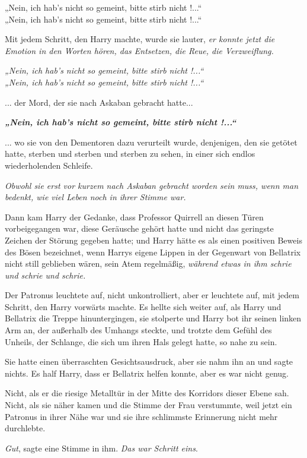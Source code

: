 {„Nein, ich hab's nicht so gemeint, bitte stirb nicht !...“\\ „Nein, ich hab's nicht so gemeint, bitte stirb nicht !...“

Mit jedem Schritt, den Harry machte, wurde sie lauter, \emph{er konnte jetzt die Emotion in den Worten hören, das Entsetzen, die Reue, die Verzweiflung.}

\emph{„Nein, ich hab's nicht so gemeint, bitte stirb nicht !...“\\ „Nein, ich hab's nicht so gemeint, bitte stirb nicht !...“}

... der Mord, der sie nach Askaban gebracht hatte...

\textbf{\emph{„Nein, ich hab's nicht so gemeint, bitte stirb nicht !...“}}

... wo sie von den Dementoren dazu verurteilt wurde, denjenigen, den sie getötet hatte, sterben und sterben und sterben zu sehen, in einer sich endlos wiederholenden Schleife.

\emph{Obwohl sie erst vor kurzem nach Askaban gebracht worden sein muss, wenn man bedenkt, wie viel Leben noch in ihrer Stimme war.}

Dann kam Harry der Gedanke, dass Professor Quirrell an diesen Türen vorbeigegangen war, diese Geräusche gehört hatte und nicht das geringste Zeichen der Störung gegeben hatte; und Harry hätte es als einen positiven Beweis des Bösen bezeichnet, wenn Harrys eigene Lippen in der Gegenwart von Bellatrix nicht still geblieben wären, sein Atem regelmäßig, \emph{während etwas in ihm schrie und schrie und schrie.}

Der Patronus leuchtete auf, nicht unkontrolliert, aber er leuchtete auf, mit jedem Schritt, den Harry vorwärts machte. Es hellte sich weiter auf, als Harry und Bellatrix die Treppe hinuntergingen, sie stolperte und Harry bot ihr seinen linken Arm an, der außerhalb des Umhangs steckte, und trotzte dem Gefühl des Unheils, der Schlange, die sich um ihren Hals gelegt hatte, so nahe zu sein.

Sie hatte einen überraschten Gesichtsausdruck, aber sie nahm ihn an und sagte nichts. Es half Harry, dass er Bellatrix helfen konnte, aber es war nicht genug.

Nicht, als er die riesige Metalltür in der Mitte des Korridors dieser Ebene sah. Nicht, als sie näher kamen und die Stimme der Frau verstummte, weil jetzt ein Patronus in ihrer Nähe war und sie ihre schlimmste Erinnerung nicht mehr durchlebte.

\emph{Gut}, sagte eine Stimme in ihm. \emph{Das war Schritt eins}.

}
